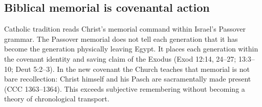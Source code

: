 \subsection*{Biblical memorial is covenantal action}

Catholic tradition reads Christ's memorial command within Israel's Passover
grammar. The Passover memorial does not tell each generation that it has become
the generation physically leaving Egypt. It places each generation within the
covenant identity and saving claim of the Exodus (Exod 12:14, 24--27; 13:3--10;
Deut 5:2--3). In the new covenant the Church teaches that memorial is not bare
recollection: Christ himself and his Pasch are sacramentally made present
(CCC 1363--1364). This exceeds subjective remembering without becoming a
theory of chronological transport.


